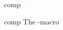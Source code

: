 \documentclass{stex}
\begin{document}
  \begin{smodule}[title=The \texttt{comp}-Macro]{comp}
  
  \begin{sfunction}{comp}{\comp}
    The \dcs-macro
  \end{sfunction}
   
  \end{smodule}
\end{document}
